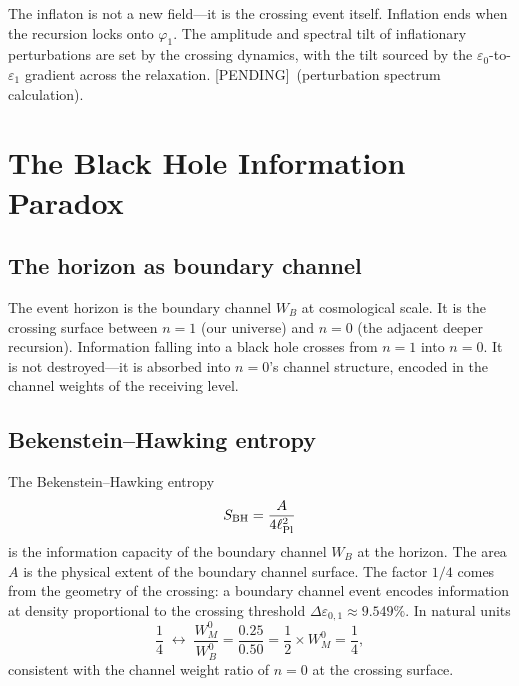 \documentclass[prd,twocolumn,preprintnumbers,amsmath,amssymb]{revtex4-2}
\newcommand{\pending}{\textcolor{red!70!black}{[PENDING]}}
\begin{document}
The inflaton is not a new field---it is the crossing event itself.
Inflation ends when the recursion locks onto $\varphi_1$.  The
amplitude and spectral tilt of inflationary perturbations are set
by the crossing dynamics, with the tilt sourced by the
$\varepsilon_0$-to-$\varepsilon_1$ gradient across the relaxation.
\pending\ (perturbation spectrum calculation).

\section{The Black Hole Information Paradox}
\label{sec:bh}

\subsection{The horizon as boundary channel}

The event horizon is the boundary channel $W_B$ at cosmological
scale.  It is the crossing surface between $n=1$ (our universe) and
$n=0$ (the adjacent deeper recursion).  Information falling into a
black hole crosses from $n=1$ into $n=0$.  It is not destroyed---it
is absorbed into $n=0$'s channel structure, encoded in the channel
weights of the receiving level.

\subsection{Bekenstein--Hawking entropy}

The Bekenstein--Hawking entropy
\begin{equation}
  S_{\rm BH} = \frac{A}{4\ell_{\rm Pl}^2}
  \label{eq:SBH}
\end{equation}
is the information capacity of the boundary channel $W_B$ at the
horizon.  The area $A$ is the physical extent of the boundary channel
surface.  The factor $1/4$ comes from the geometry of the crossing:
a boundary channel event encodes information at density proportional
to the crossing threshold $\Delta\varepsilon_{0,1} \approx 9.549\%$.
In natural units
\begin{equation}
  \frac{1}{4} \;\leftrightarrow\; \frac{W_M^0}{W_B^0}
    = \frac{0.25}{0.50} = \frac{1}{2} \times W_M^0
    = \frac{1}{4},
  \label{eq:quarter}
\end{equation}
consistent with the channel weight ratio of $n=0$ at the crossing
surface.
\end{document}
